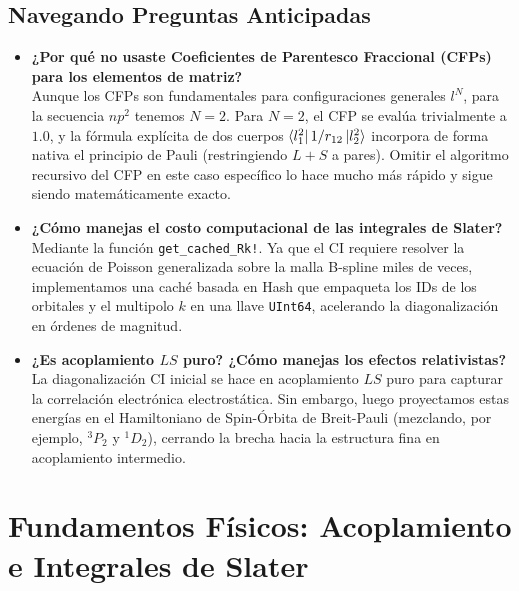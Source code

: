 \documentclass[11pt,a4paper]{article}
\begin{document}
\subsection{Navegando Preguntas Anticipadas}
\begin{itemize}
    \item \textbf{¿Por qué no usaste Coeficientes de Parentesco Fraccional (CFPs) para los elementos de matriz?} \\
    Aunque los CFPs son fundamentales para configuraciones generales $l^N$, para la secuencia $np^2$ tenemos $N=2$. Para $N=2$, el CFP se evalúa trivialmente a $1.0$, y la fórmula explícita de dos cuerpos $\bra{l_1^2} 1/r_{12} \ket{l_2^2}$ incorpora de forma nativa el principio de Pauli (restringiendo $L+S$ a pares). Omitir el algoritmo recursivo del CFP en este caso específico lo hace mucho más rápido y sigue siendo matemáticamente exacto.
    \item \textbf{¿Cómo manejas el costo computacional de las integrales de Slater?} \\
    Mediante la función \texttt{get\_cached\_Rk!}. Ya que el CI requiere resolver la ecuación de Poisson generalizada sobre la malla B-spline miles de veces, implementamos una caché basada en Hash que empaqueta los IDs de los orbitales y el multipolo $k$ en una llave \texttt{UInt64}, acelerando la diagonalización en órdenes de magnitud.
    \item \textbf{¿Es acoplamiento $LS$ puro? ¿Cómo manejas los efectos relativistas?} \\
    La diagonalización CI inicial se hace en acoplamiento $LS$ puro para capturar la correlación electrónica electrostática. Sin embargo, luego proyectamos estas energías en el Hamiltoniano de Spin-Órbita de Breit-Pauli (mezclando, por ejemplo, $^3P_2$ y $^1D_2$), cerrando la brecha hacia la estructura fina en acoplamiento intermedio.
\end{itemize}

\newpage
\section{Fundamentos Físicos: Acoplamiento e Integrales de Slater}
\end{document}
